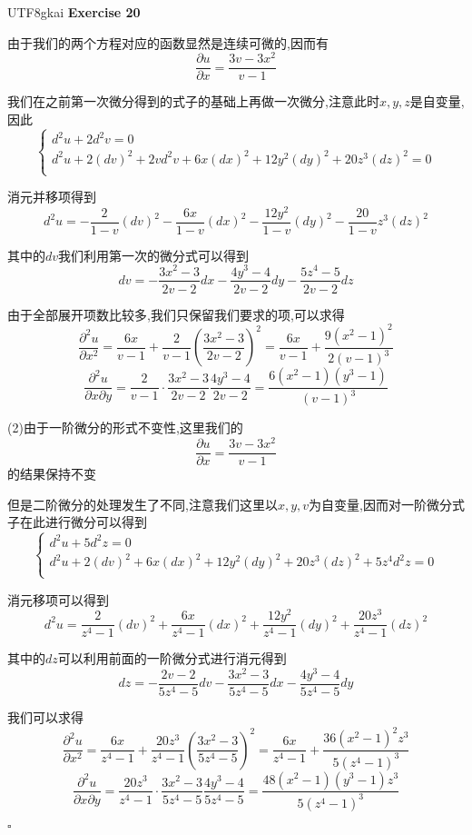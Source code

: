 \documentclass{article}
\newenvironment{exercise}[1]{%
{\textbf{Exercise #1} \\ 
    }
}{
  \hfill $\square$ 
  \par\bigskip 
}
\newcommand{\parameter}[1]{\left(#1\right)}
\begin{document}
\begin{CJK}{UTF8}{gkai}
\begin{exercise}{20}
    由于我们的两个方程对应的函数显然是连续可微的,因而有
    \[\frac{\partial u}{\partial x} = \frac{3v - 3x^2}{v - 1}\]

    我们在之前第一次微分得到的式子的基础上再做一次微分,注意此时$x,y,z$是自变量,因此
    \[\begin{cases}
        d^2 u + 2 d^2 v = 0\\
        d^2 u + 2 (dv)^2 + 2 v d^2 v + 6x (dx)^2 + 12 y^2 (dy)^2 + 20 z^3 (dz)^2 = 0\\
    \end{cases}\]

    消元并移项得到
    \[d^2 u = -\frac{2}{1 - v}(dv)^2 - \frac{6x}{1 - v}(dx)^2 -\frac{12y^2}{1 - v}(dy)^2 - \frac{20}{1 - v}z^3(dz)^2 \]

    其中的$dv$我们利用第一次的微分式可以得到
    \[dv = -\frac{3x^2 - 3}{2v - 2}dx - \frac{4y^3 - 4}{2v - 2} dy - \frac{5z^4 - 5}{2v - 2}dz\]

    由于全部展开项数比较多,我们只保留我们要求的项,可以求得
    \[\frac{\partial^2 u}{\partial x^2} = \frac{6x}{v - 1} + \frac{2}{v - 1}\parameter{\frac{3x^2 - 3}{2v - 2}}^2 = \frac{6x}{v - 1} + \frac{9(x^2 - 1)^2}{2(v - 1)^3} \]
    \[\dfrac{\partial^2 u}{\partial x \partial y} = \frac{2}{v - 1} \cdot \frac{3x^2 - 3}{2v - 2} \frac{4y^3 - 4}{2v - 2} = \frac{6(x^2 - 1)(y^3 - 1)}{(v - 1)^3}\]
    
    (2)由于一阶微分的形式不变性,这里我们的
    \[\frac{\partial u}{\partial x} = \frac{3v - 3x^2}{v - 1}\]
    的结果保持不变

    但是二阶微分的处理发生了不同,注意我们这里以$x,y,v$为自变量,因而对一阶微分式子在此进行微分可以得到
    \[\begin{cases}
        d^2 u + 5 d^2 z = 0\\
        d^2 u + 2 (dv)^2 + 6x (dx)^2 + 12 y^2 (dy)^2 + 20 z^3 (dz)^2 + 5 z^4 d^2 z = 0\\
    \end{cases}\]

    消元移项可以得到
    \[d^2 u = \frac{2}{z^4 - 1}(dv)^2 + \frac{6x}{z^4 - 1}(dx)^2 + \frac{12y^2}{z^4 - 1}(dy)^2 + \frac{20z^3}{z^4 - 1}(dz)^2\]

    其中的$dz$可以利用前面的一阶微分式进行消元得到
    \[dz = -\frac{2v - 2}{5z^4 - 5}dv - \frac{3x^2 - 3}{5z^4 - 5}dx - \frac{4y^3 - 4}{5z^4 - 5}dy\]

    我们可以求得
    \[\frac{\partial^2 u}{\partial x^2} = \frac{6x}{z^4 - 1} + \frac{20z^3}{z^4 - 1}\parameter{\frac{3x^2 - 3}{5z^4 - 5}}^2 = \frac{6x}{z^4 - 1} + \frac{36(x^2 - 1)^2 z^3}{5(z^4 - 1)^3}\]
    \[\frac{\partial^2 u}{\partial x \partial y} = \frac{20z^3}{z^4 - 1}\cdot \frac{3x^2 - 3}{5z^4 - 5} \frac{4y^3 - 4}{5z^4 - 5} = \frac{48(x^2 - 1)(y^3 - 1)z^3}{5(z^4 - 1)^3}\]
\end{exercise}

\end{CJK}
\end{document}

